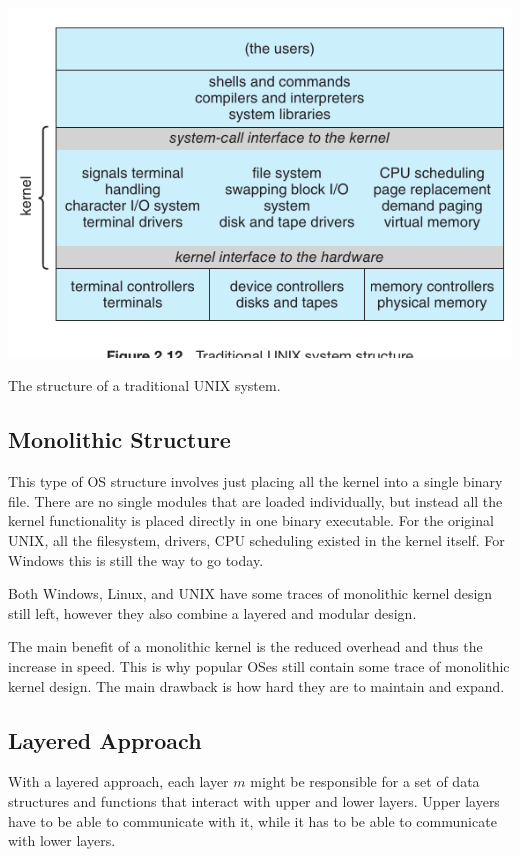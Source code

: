 \documentclass{tufte-handout}
\begin{document}
 \begin{marginfigure}
	\includegraphics[scale=0.3]{OS_structure.png}
	\caption{The structure of a traditional UNIX system.}
\end{marginfigure}


\subsection{Monolithic Structure}
This type of OS structure involves just placing all the kernel into a single 
binary file. There are no single modules that are loaded individually, but 
instead all the kernel functionality is placed directly in one binary executable.
For the original UNIX, all the filesystem, drivers, CPU scheduling existed in the
kernel itself. For Windows this is still the way to go today. 

Both Windows, Linux, and UNIX have some traces of monolithic kernel design still 
left, however they also combine a layered and modular design. 

The main benefit of a monolithic kernel is the reduced overhead and thus the increase
in speed. This is why popular OSes still contain some trace of monolithic kernel design.
The main drawback is how hard they are to maintain and expand.

\subsection{Layered Approach}
With a layered approach, each layer $m$ might be responsible for a set of data structures
and functions that interact with upper and lower layers. Upper layers have to be 
able to communicate with it, while it has to be able to communicate with lower layers.
\end{document}

